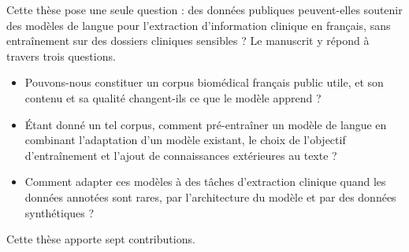 Cette thèse pose une seule question : des données publiques peuvent-elles soutenir
des modèles de langue pour l'extraction d'information clinique en français, sans
entraînement sur des dossiers cliniques sensibles ? Le manuscrit y répond à travers
trois questions.

\begin{itemize}
  \item Pouvons-nous constituer un corpus biomédical français public utile, et son contenu et sa qualité changent-ils ce que le modèle apprend ?
  \item Étant donné un tel corpus, comment pré-entraîner un modèle de langue en combinant l'adaptation d'un modèle existant, le choix de l'objectif d'entraînement et l'ajout de connaissances extérieures au texte ?
  \item Comment adapter ces modèles à des tâches d'extraction clinique quand les données annotées sont rares, par l'architecture du modèle et par des données synthétiques ?
\end{itemize}

\noindent Cette thèse apporte sept contributions.


